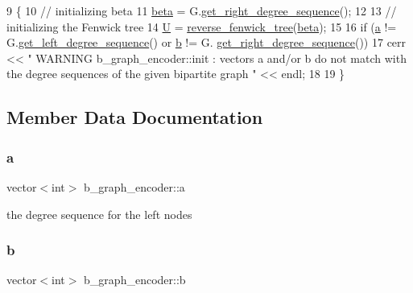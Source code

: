 \begin{DoxyCode}
9 \{
10   \textcolor{comment}{// initializing beta}
11   \hyperlink{classb__graph__encoder_ae54d76cc4cee399d98951f870897a144}{beta} = G.\hyperlink{classb__graph_a2711566385b92b02f4c03abdc1f9a582}{get\_right\_degree\_sequence}();
12 
13   \textcolor{comment}{// initializing the Fenwick tree}
14   \hyperlink{classb__graph__encoder_ac810138443002a2b2cf579ced2dc34ce}{U} = \hyperlink{classreverse__fenwick__tree}{reverse\_fenwick\_tree}(\hyperlink{classb__graph__encoder_ae54d76cc4cee399d98951f870897a144}{beta});
15 
16   \textcolor{keywordflow}{if} (\hyperlink{classb__graph__encoder_afd22d167f495cd85b41397f337c377c2}{a} != G.\hyperlink{classb__graph_afd65fb655f7e24217393a10533b87d3c}{get\_left\_degree\_sequence}() or \hyperlink{classb__graph__encoder_a767826e268702e45ab71565e096a52b8}{b} != G.
      \hyperlink{classb__graph_a2711566385b92b02f4c03abdc1f9a582}{get\_right\_degree\_sequence}())
17     cerr << \textcolor{stringliteral}{" WARNING b\_graph\_encoder::init : vectors a and/or b do not match with the degree sequences of
       the given bipartite graph  "} << endl;
18 
19 \}
\end{DoxyCode}


\subsection{Member Data Documentation}
\mbox{\label{classb__graph__encoder_afd22d167f495cd85b41397f337c377c2}} 
\subsubsection{\texorpdfstring{a}{a}}
{\footnotesize\ttfamily vector$<$int$>$ b\+\_\+graph\+\_\+encoder\+::a\hspace{0.3cm}{\ttfamily [private]}}



the degree sequence for the left nodes 

\mbox{\label{classb__graph__encoder_a767826e268702e45ab71565e096a52b8}} 
\subsubsection{\texorpdfstring{b}{b}}
{\footnotesize\ttfamily vector$<$int$>$ b\+\_\+graph\+\_\+encoder\+::b\hspace{0.3cm}{\ttfamily [private]}}



